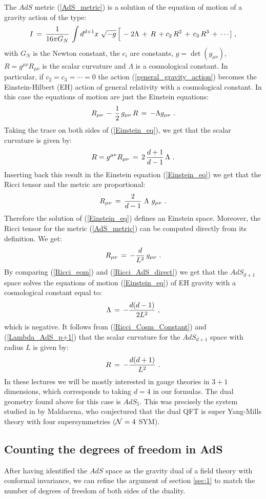 \documentclass[12pt,notitlepage]{article}
\newcommand{\beq}{\begin{equation}}
\newcommand{\eeq}{\end{equation}}
\begin{document}
The $AdS$ metric (\ref{AdS_metric})  is a solution of the equation of motion of a gravity action of the type:
\beq
I\,=\,{1\over 16\pi G_N}\,
\int d^{d+1}x\,\,\sqrt{-g}\,\Big[\,-2\Lambda\,+\,R\,+c_2\, R^2\,+\,c_3\, R^3\,+\,\cdots]\,\,,
\label{general_gravity_action}
\eeq
with $G_N$ is the Newton constant, the $c_i$ are constants, $g=\det (g_{\mu\nu})$, $R=g^{\mu\nu}R_{\mu\nu}$  is the scalar curvature and $\Lambda$ is a  cosmological constant. In particular, if $c_2=c_3=\cdots = 0$  the action (\ref{general_gravity_action}) becomes the Einstein-Hilbert (EH) action of general relativity with a cosmological constant. In this case the equations of motion  are just  the Einstein equations:
\beq
R_{\mu\nu}\,-\,{1\over 2}\,g_{\mu\nu}\,R\,=\,-\Lambda g_{\mu\nu}\,\,.
\label{Einstein_eq}
\eeq
Taking the trace on both sides of (\ref{Einstein_eq}), we get that the scalar curvature is given by:
\beq
R=g^{\mu\nu}R_{\mu\nu}\,=\,2\,{d+1\over d-1}\,\Lambda\,\,.
\label{Ricci_Cosm_Constant}
\eeq
Inserting back this result in the Einstein equation (\ref{Einstein_eq}) we get that  the Ricci tensor and the metric are proportional:
\beq
R_{\mu\nu}\,=\,{2\over d-1}\,\,\Lambda\,\,g_{\mu\nu}\,\,.
\label{Ricci_eom}
\eeq	
Therefore the  solution of (\ref{Einstein_eq}) defines an Einstein space. Moreover, the Ricci tensor for the metric (\ref{AdS_metric}) can be computed directly from  its definition. We get:
\beq
R_{\mu\nu}\,=\,-{d\over L^2}\,g_{\mu\nu}\,\,.
\label{Ricci_AdS_direct}
\eeq
By comparing  (\ref{Ricci_eom}) and (\ref{Ricci_AdS_direct})  we get that the $AdS_{d+1}$  space solves the equations of motion (\ref{Einstein_eq}) of EH gravity with  a cosmological constant equal to:
\beq
\Lambda\,=\,-{d(d-1)\over 2 L^2}\,\,,
\label{Lambda_AdS_p+1}
\eeq
which is negative. It follows from (\ref{Ricci_Cosm_Constant}) and (\ref{Lambda_AdS_p+1}) that the scalar curvature for the $AdS_{d+1}$ space with radius $L$  is given by:
\beq
R\,=\,-{d(d+1)\over L^2}\,\,.
\eeq
In these lectures we will be mostly interested in gauge theories in $3+1$ dimensions, which corresponds to taking $d=4$ in our formulas. The dual geometry found above for this case is $AdS_5$. This was precisely the system studied  in \cite{Maldacena:1997re} by Maldacena, who conjectured that the dual QFT is super Yang-Mills theory with four supersymmetries  (${\cal N}=4$ SYM).  






\subsection{Counting the degrees of freedom in AdS}
\label{subsec:2.1}
After having identified the $AdS$ space as the gravity dual of a field theory with conformal invariance, we can refine the argument of section \ref{sec:1} to match the number of  degrees of freedom of both sides of the duality. 
\end{document}
